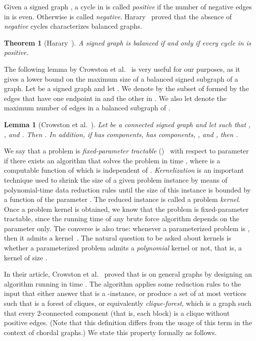 \documentclass[
final
]{dmtcs-episciences}
\newtheorem{theorem}{Theorem}{\bfseries}{\itshape}
\newtheorem{lemma}{Lemma}{\bfseries}{\itshape}
\begin{document}
Given a signed graph , a cycle  in  is called {\it{positive}} if the number of negative edges in  is even. Otherwise  is called {\it{negative}}.
Harary~\cite{harary1953}  proved that the absence of {\it{negative}} cycles characterizes balanced graphs.
	
\begin{theorem}[Harary~\cite{harary1953}]\label{theorem2.1}
A signed graph  is balanced if and only if every cycle in  is positive.	
\end{theorem}
	

The following lemma by Crowston et al.~\cite{crowston2013maximum} is very useful for our purposes, as it gives a lower bound on the maximum size of a balanced signed subgraph of a graph. Let  be a signed graph and let . We denote by  the subset of  formed by the edges that have one endpoint in  and the other in . We also let   denote the maximum number of edges in a balanced subgraph of .

	\begin{lemma}[Crowston et al.~\cite{crowston2013maximum}]
 Let  be a connected signed graph and let  such that , , and . Then . In addition, if  has  components,  has  components, , and , then .  	 \label{beta}
	\end{lemma}
	


	We say that a problem is {\it{fixed-parameter tractable}} ({})~\cite{FG06,Nie06,DF13,CyganFKLMPPS15} with respect to parameter 
if there exists an algorithm that solves the problem  in time , where  is a computable function of  which is independent
of .
{\it{Kernelization}} is an important
technique used to shrink the size of a given problem instance by means of
polynomial-time data reduction rules until the size of this instance is bounded by a function of
the parameter . The reduced instance is called a problem {\it{kernel}}. Once a problem
kernel is obtained, we know that the problem is fixed-parameter tractable, since
the running time of any brute force algorithm depends on the parameter  only.
The converse is also true: whenever a parameterized problem is {}, then it admits a kernel~\cite{FG06,Nie06,DF13,CyganFKLMPPS15}. The natural question to be asked about kernels is whether a parameterized problem admits a {\em polynomial} kernel or not, that is, a kernel of size .

	In their article, Crowston et al.~\cite{crowston2013maximum} proved that {} is {} on general graphs by designing an algorithm  running in  time . The algorithm applies some reduction rules to the input  that either answer that  is a {}-instance,  or produce a set  of at most  vertices such that  is a forest of cliques, or equivalently \emph{clique-forest}, which is a graph such that every 2-connected component (that is, each block) is a clique without positive edges. (Note that this definition differs from the usage of this term in the context of chordal graphs.) We state this property formally as follows.
\end{document}
